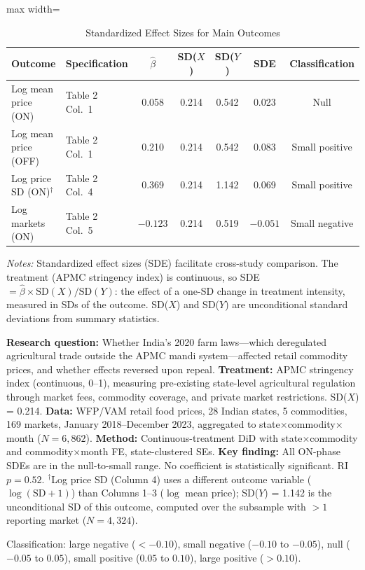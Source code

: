 \documentclass[12pt]{article}
\begin{document}
\begin{table}[H]
\centering
\caption{Standardized Effect Sizes for Main Outcomes}
\label{tab:sde}
\begin{adjustbox}{max width=\textwidth}
\begin{tabular}{llccccc}
\toprule
Outcome & Specification & $\hat{\beta}$ & SD($X$) & SD($Y$) & SDE & Classification \\
\midrule
Log mean price (ON) & Table 2 Col.\ 1 & 0.058 & 0.214 & 0.542 & 0.023 & Null \\
Log mean price (OFF) & Table 2 Col.\ 1 & 0.210 & 0.214 & 0.542 & 0.083 & Small positive \\
Log price SD (ON)$^{\dagger}$ & Table 2 Col.\ 4 & 0.369 & 0.214 & 1.142 & 0.069 & Small positive \\
Log markets (ON) & Table 2 Col.\ 5 & $-0.123$ & 0.214 & 0.519 & $-0.051$ & Small negative \\
\bottomrule
\end{tabular}
\end{adjustbox}
\par\vspace{0.3em}
{\footnotesize \emph{Notes:} Standardized effect sizes (SDE) facilitate cross-study comparison.
The treatment (APMC stringency index) is continuous, so SDE $= \hat{\beta} \times \text{SD}(X) / \text{SD}(Y)$:
the effect of a one-SD change in treatment intensity, measured in SDs of the outcome.
SD($X$) and SD($Y$) are unconditional standard deviations from summary statistics.

\textbf{Research question:} Whether India's 2020 farm laws---which deregulated agricultural trade outside the APMC mandi system---affected retail commodity prices, and whether effects reversed upon repeal.
\textbf{Treatment:} APMC stringency index (continuous, 0--1), measuring pre-existing state-level agricultural regulation through market fees, commodity coverage, and private market restrictions. SD($X$) = 0.214.
\textbf{Data:} WFP/VAM retail food prices, 28 Indian states, 5 commodities, 169 markets, January 2018--December 2023, aggregated to state$\times$commodity$\times$month ($N = 6{,}862$).
\textbf{Method:} Continuous-treatment DiD with state$\times$commodity and commodity$\times$month FE, state-clustered SEs.
\textbf{Key finding:} All ON-phase SDEs are in the null-to-small range. No coefficient is statistically significant. RI $p = 0.52$.
$^{\dagger}$Log price SD (Column 4) uses a different outcome variable ($\log(\text{SD} + 1)$) than Columns 1--3 ($\log$ mean price); SD($Y$) = 1.142 is the unconditional SD of this outcome, computed over the subsample with $>1$ reporting market ($N = 4{,}324$).

Classification: large negative ($< -0.10$), small negative ($-0.10$ to $-0.05$), null ($-0.05$ to $0.05$), small positive ($0.05$ to $0.10$), large positive ($> 0.10$).}
\end{table}
\end{document}
